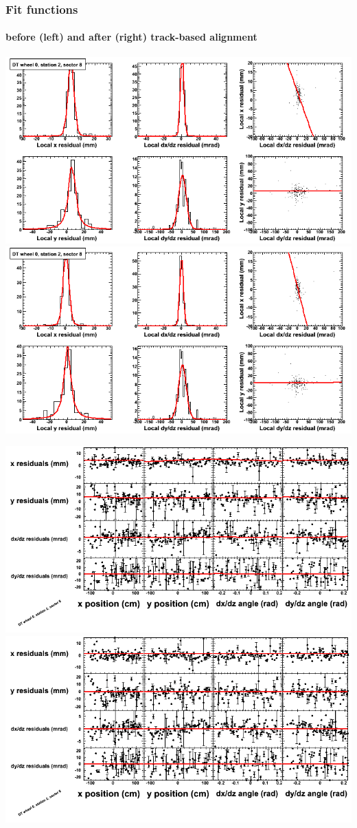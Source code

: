 \documentclass[compress]{beamer}
\begin{document}
\begin{frame}
\frametitle{Fit functions}
\framesubtitle{before (left) and after (right) track-based alignment}
\includegraphics[width=0.5\linewidth]{fitfunctions_re01/MBwhCst2sec08_bellcurves.png} \includegraphics[width=0.5\linewidth]{fitfunctions_re05/MBwhCst2sec08_bellcurves.png}

\includegraphics[width=0.5\linewidth]{fitfunctions_re01/MBwhCst2sec08_polynomials.png} \includegraphics[width=0.5\linewidth]{fitfunctions_re05/MBwhCst2sec08_polynomials.png}
\end{frame}
\end{document}
